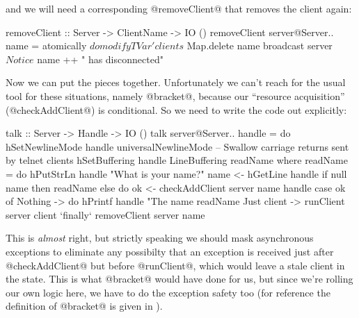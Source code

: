 
\noindent and we will need a corresponding @removeClient@ that removes
the client again:

\begin{haskell}
removeClient :: Server -> ClientName -> IO ()
removeClient server@Server{..} name = atomically $ do
    modifyTVar' clients $ Map.delete name
    broadcast server $ Notice $ name ++ " has disconnected"
\end{haskell}

Now we can put the pieces together.  Unfortunately we can't reach for
the usual tool for these situations, namely @bracket@, because our
``resource acquisition'' (@checkAddClient@) is conditional.  So we
need to write the code out explicitly:

\begin{haskell}
talk :: Server -> Handle -> IO ()
talk server@Server{..} handle = do
    hSetNewlineMode handle universalNewlineMode
        -- Swallow carriage returns sent by telnet clients
    hSetBuffering handle LineBuffering
    readName
  where
    readName = do
      hPutStrLn handle "What is your name?"
      name <- hGetLine handle
      if null name
         then readName
         else do
                ok <- checkAddClient server name handle
                case ok of
                  Nothing -> do
                     hPrintf handle
                        "The name %
                     readName
                  Just client ->
                     runClient server client
                       `finally` removeClient server name
\end{haskell}

This is \emph{almost} right, but strictly speaking we should mask
asynchronous exceptions to eliminate any possibilty that an exception
is received just after @checkAddClient@ but before @runClient@, which
would leave a stale client in the state.  This is what @bracket@ would
have done for us, but since we're rolling our own logic here, we have
to do the exception safety too (for reference the definition of
@bracket@ is given in ).

